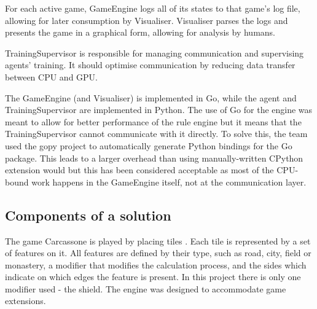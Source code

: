 For each active game, GameEngine logs all of its states to that game's log file,
allowing for later consumption by Visualiser. Visualiser parses the logs
and presents the game in a graphical form, allowing for analysis by humans.

TrainingSupervisor is responsible for managing communication and supervising agents' training.
It should optimise communication by reducing data transfer between CPU and GPU.

The GameEngine (and Visualiser) is implemented in Go, while the agent and TrainingSupervisor
are implemented in Python. The use of Go for the engine was meant to allow for better performance of
the rule engine but it means that the TrainingSupervisor cannot communicate with it directly.
To solve this, the team used the gopy project \cite{gopy} to automatically generate
Python bindings \cite{LanguageBindings} for the Go package. This leads to a larger overhead than
using manually-written CPython extension would but this has been considered acceptable as most of
the CPU-bound work happens in the GameEngine itself, not at the communication layer.

\subsection{Components of a solution}

The game Carcassone is played by placing tiles \cite{CarcassoneRules}. Each tile is represented by a set of features on it. All features are defined by their type, such as road, city, field or monastery, a modifier that modifies the calculation process, and the sides which indicate on which edges the feature is present. In this project there is only one modifier used - the shield. The engine was designed to accommodate game extensions. 

